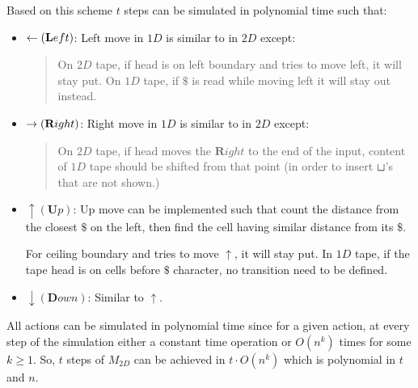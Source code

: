 \noindent Based on this scheme $t$ steps can be simulated in polynomial time such that:
\begin{itemize}
  \item $\leftarrow (\textbf{L}eft)$: Left move in $1D$ is similar to in $2D$ except:
    \begin{quote}
      On $2D$ tape, if head is on left boundary and tries to move left, it will stay put. On $1D$ tape, if $\$$ is read while moving left it will stay out instead. 
    \end{quote}
  \item $\rightarrow (\textbf{R}ight)$: Right move in $1D$ is similar to in $2D$ except:
    \begin{quote}
      On $2D$ tape, if head moves the $\textbf{R}ight$ to the end of the input, content of $1D$ tape should be shifted from that point (in order to insert $\sqcup$'s that are not shown.)
    \end{quote}
  \item $\uparrow (\textbf{U}p)$: Up move can be implemented such that count the distance from the closest $\$$ on the left, then find the cell having similar distance from its $\$$.
  
    For ceiling boundary and tries to move $\uparrow$, it will stay put. In $1D$ tape, if the tape head is on cells before $\$$ character, no transition need to be defined.
  \item $\downarrow (\textbf{D}own)$: Similar to $\uparrow$.
\end{itemize}

\noindent All actions can be simulated in polynomial time since for a given action, at every step of the simulation either a constant time operation or $O(n^k)$ times for some $k \geq 1$. So, $t$ steps of $M_{2D}$ can be achieved in $t \cdot O(n^k)$ which is polynomial in $t$ and $n$.
